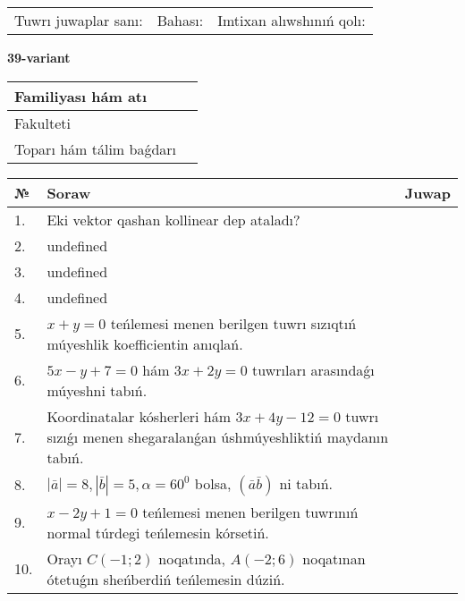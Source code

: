 \documentclass{article}
\begin{document}
\vspace{0.7cm}

\begin{tabular}{lll}
Tuwrı juwaplar sanı: \underline{\hspace{1cm}} & 
Bahası: \underline{\hspace{1cm}} & 
Imtixan alıwshınıń qolı: \underline{\hspace{2cm}} \\
\end{tabular}

\egroup

\newpage


\textbf{39-variant}\\

\bgroup
\def\arraystretch{1.6} %

\begin{tabular}{|m{5.7cm}|m{9.5cm}|}
\hline
Familiyası hám atı & \\
\hline
Fakulteti  & \\
\hline
Toparı hám tálim baǵdarı  & \\
\hline
\end{tabular}

\vspace{0.7cm}

\begin{tabular}{|m{0.7cm}|m{10cm}|m{4cm}|}
\hline
№ & Soraw & Juwap \\
\hline
1. & Eki vektor qashan kollinear dep ataladı? &  \\
\hline
2. & undefined &  \\
\hline
3. & undefined &  \\
\hline
4. & undefined &  \\
\hline
5. & \(x + y = 0\) teńlemesi menen berilgen tuwrı sızıqtıń múyeshlik koefficientin anıqlań. &  \\
\hline
6. & \(5 x - y + 7 = 0\) hám \(3 x + 2 y = 0\) tuwrıları arasındaǵı múyeshni tabıń. &  \\
\hline
7. & Koordinatalar kósherleri hám \( 3 x + 4 y - 12 = 0 \) tuwrı sızıǵı menen shegaralanǵan úshmúyeshliktiń maydanın tabıń. &  \\
\hline
8. & \(\left| \bar{a} \right| = 8, \left| \bar{b} \right| = 5, \alpha = 60^{0}\) bolsa, \(( \bar{a}\bar{b} )\) ni tabıń. &  \\
\hline
9. & \(x - 2 y + 1 = 0\) teńlemesi menen berilgen tuwrınıń normal túrdegi teńlemesin kórsetiń. &  \\
\hline
10. & Orayı \(C (- 1;2)\) noqatında, \(A (- 2;6 )\) noqatınan ótetuǵın sheńberdiń teńlemesin dúziń. & \\
\hline
\end{tabular}
\end{document}
